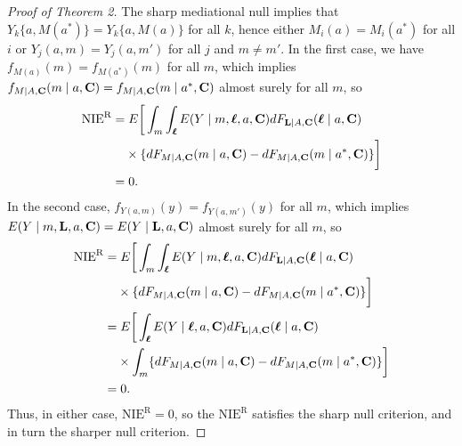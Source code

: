 \documentclass[12pt]{article}
\begin{document}
\begin{proof}[Proof of Theorem 2]
    The sharp mediational null implies that $Y_{k}\{a,M(a^*)\} = Y_{k}\{a,M(a)\}$ for all $k$, hence either $M_i(a) = M_i(a^*)$ for all $i$ or $Y_j(a,m) = Y_j(a,m')$ for all $j$ and $m\neq m'$. In the first case, we have $f_{M(a)}(m)=f_{M(a^*)}(m)$ for all $m$, which implies $f_{M\mid A, {\bf C}}(m\mid a, {\bf C})=f_{M\mid A, {\bf C}}(m\mid a^*, {\bf C})$ almost surely for all $m$, so %
    \begin{align*}
        \text{NIE}^{\text{R}} =&\; E\bigg[\int_m \int_{\boldsymbol{\ell}} E(Y\mid m,\boldsymbol{\ell},a,{\bf C})dF_{{\bf L}\mid A, {\bf C}}(\boldsymbol{\ell}\mid a, {\bf C})\\
        &\times \{dF_{M\mid A,{\bf C}}(m\mid a,{\bf C}) - dF_{M\mid A,{\bf C}}(m\mid a^*,{\bf C})\}\bigg]\\
        =&\; 0.
    \end{align*}
    In the second case, $f_{Y(a,m)}(y) = f_{Y(a,m')}(y)$ for all $m$, which implies $E(Y\mid m,{\bf L},a,{\bf C}) = E(Y\mid {\bf L},a,{\bf C})$ almost surely for all $m$, so
    \begin{align*}
        \text{NIE}^{\text{R}} =&\; E\bigg[\int_m \int_{\boldsymbol{\ell}} E(Y\mid m,\boldsymbol{\ell},a,{\bf C})dF_{{\bf L}\mid A, {\bf C}}(\boldsymbol{\ell}\mid a, {\bf C})\\
        &\times \{dF_{M\mid A,{\bf C}}(m\mid a,{\bf C}) - dF_{M\mid A,{\bf C}}(m\mid a^*,{\bf C})\}\bigg]\\
        =&\; E\bigg[\int_{\boldsymbol{\ell}} E(Y\mid \boldsymbol{\ell},a,{\bf C})dF_{{\bf L}\mid A, {\bf C}}(\boldsymbol{\ell}\mid a, {\bf C})\\
        &\times \int_m \{dF_{M\mid A,{\bf C}}(m\mid a,{\bf C}) - dF_{M\mid A,{\bf C}}(m\mid a^*,{\bf C})\}\bigg]\\
        =&\; 0.
    \end{align*}
    Thus, in either case, $\text{NIE}^{\text{R}}=0$, so the $\text{NIE}^{\text{R}}$ satisfies the sharp null criterion, and in turn the sharper null criterion.


\end{proof}
\end{document}
